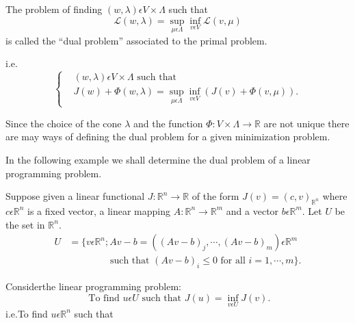 \begin{defi*}
The problem of finding $(w, \lambda) \epsilon V \times \Lambda$ such that
\begin{equation*}
\mathscr{L} (w, \lambda) = \sup_{\mu \epsilon \Lambda} \inf_{v \epsilon V} \mathscr{L} (v, \mu)\tag{1.6}\label{chap5-eq1.6}
\end{equation*}
is called the ``dual problem'' associated to the primal problem.

i.e. 
\begin{equation*}
\begin{cases}
& (w, \lambda) \epsilon V \times \Lambda \text{ such that }\\
& J(w) + \Phi (w, \lambda) = \sup_{\mu \epsilon \Lambda} \inf_{v \epsilon V} (J(v) + \Phi (v, \mu)).\tag*{$(1.6)'$}\label{chap5-eq1.6'}
\end{cases}
\end{equation*}
\end{defi*}

\begin{remark*}
Since the choice of the cone $\lambda$ and the function $\Phi : V \times \Lambda \to \mathbb{R}$ are not unique there are may ways of defining the dual problem for a given minimization problem.
\end{remark*}

In the following example we shall determine the dual problem of a linear programming problem.

Suppose given a linear functional $J : \mathbb{R}^{n} \to \mathbb{R}$ of the form $J(v) = (c, v)_{\mathbb{R}^{n}}$ where $c \epsilon \mathbb{R}^{n}$ is a fixed vector, a linear mapping $A : \mathbb{R}^{n} \to \mathbb{R}^{m}$ and a vector $b \epsilon \mathbb{R}^{m}$. Let $U$ be the set in $\mathbb{R}^{n}$.
\begin{align*}
U &= \{v \epsilon \mathbb{R}^{n} ; Av - b = ((Av - b)_{j}, \cdots ,
(Av-b)_{m}) \epsilon \mathbb{R}^{m} \\
&\qquad\qquad \text{ such that } (Av - b)_{i}
\leq 0 \text{ for all } i = 1, \cdots , m\}.\tag{1.7}\label{chap5-eq1.7}
\end{align*}

Consider\pageoriginale the linear programming problem:
\begin{equation*}
\text{ To find } u \epsilon U \text{ such that } J(u) = \inf_{v \epsilon U} J(v).\tag{1.8}\label{chap5-eq1.8}
\end{equation*}
i.e.\qquad To find  $u \epsilon \mathbb{R}^{n}$  such that

